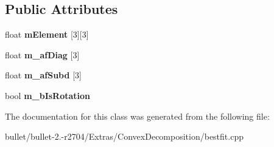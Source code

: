 \subsection*{Public Attributes}
\begin{DoxyCompactItemize}
\item 
\hypertarget{class_best_fit_1_1_eigen_a0c2909acbd2efed4e9273590ddbd0dfb}{float {\bfseries m\+Element} \mbox{[}3\mbox{]}\mbox{[}3\mbox{]}}\label{class_best_fit_1_1_eigen_a0c2909acbd2efed4e9273590ddbd0dfb}

\item 
\hypertarget{class_best_fit_1_1_eigen_a966377506bf338613cf9a3c2e5f7b4a8}{float {\bfseries m\+\_\+af\+Diag} \mbox{[}3\mbox{]}}\label{class_best_fit_1_1_eigen_a966377506bf338613cf9a3c2e5f7b4a8}

\item 
\hypertarget{class_best_fit_1_1_eigen_aae8776bbf50323a8c3231efc52e161ea}{float {\bfseries m\+\_\+af\+Subd} \mbox{[}3\mbox{]}}\label{class_best_fit_1_1_eigen_aae8776bbf50323a8c3231efc52e161ea}

\item 
\hypertarget{class_best_fit_1_1_eigen_a0f062f0178438efa10c9f3b4bc3ae64d}{bool {\bfseries m\+\_\+b\+Is\+Rotation}}\label{class_best_fit_1_1_eigen_a0f062f0178438efa10c9f3b4bc3ae64d}

\end{DoxyCompactItemize}


The documentation for this class was generated from the following file\+:\begin{DoxyCompactItemize}
\item 
bullet/bullet-\/2.-\/r2704/\+Extras/\+Convex\+Decomposition/bestfit.\+cpp\end{DoxyCompactItemize}
